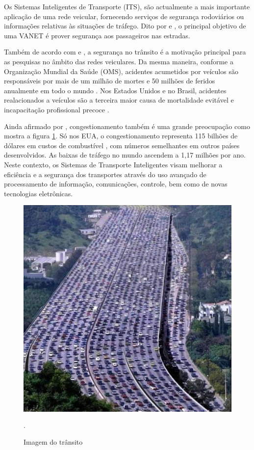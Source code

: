 \documentclass[
	12pt,				%
	oneside,			%
	a4paper,			%
	english,			%
	brazil				%
	]{abntex2ppgsi}
\begin{document}
Os Sistemas Inteligentes de Transporte (ITS), são actualmente  a  mais  importante  aplicação  de  uma  rede  veicular,  fornecendo  serviços  de segurança  rodoviários \cite{xu2003design}  ou  informações  relativas  às  situações  de  tráfego.  Dito por   e , o principal objetivo de uma VANET é prover segurança aos passageiros nas estradas.

Também de acordo com  e , a segurança no trânsito é a motivação principal para as pesquisas no âmbito das redes veiculares.  Da mesma maneira, conforme a Organização Mundial da Saúde (OMS), acidentes acumetidos por veículos são responsáveis por mais de um milhão de mortes e 50 milhões de feridos anualmente em todo o mundo \cite{peden2004world}. Nos Estados Unidos e no Brasil, acidentes realacionados a veículos são  a terceira maior causa de mortalidade evitável e incapacitação profissional precoce \cite{systematics2011crashes} \cite{el2007systematic}. 

Ainda afirmado por  , congestionamento também é uma grande preocupação como mostra a figura \ref{fig:transito}.  Só nos EUA, o congestionamento representa 115 bilhões de dólares em custos de combustível \cite{TTI}, com números semelhantes em outros países desenvolvidos. As baixas de tráfego no mundo ascendem a 1,17 milhões por ano. Neste contexto, os Sistemas de Transporte Inteligentes visam melhorar a eficiência e a segurança dos transportes através do uso avançado de processamento de informação, comunicações, controle, bem como de novas tecnologias eletrônicas.

\begin{figure} [t]
	\centering
	\includegraphics[width=0.7\columnwidth]{images/transito2.jpeg}
	\caption{Imagem do trânsito \cite{autoentusiastasclassic}}.
	\label{fig:transito}
\end{figure}
\end{document}
